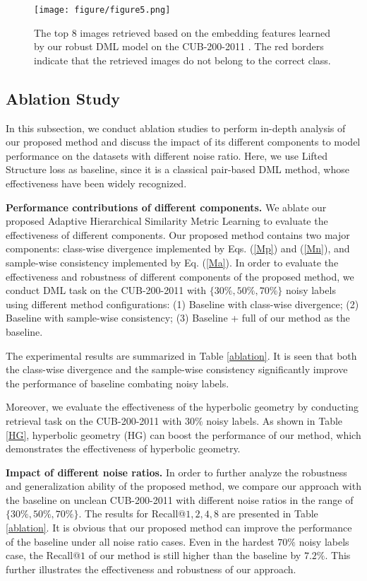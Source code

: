\documentclass[lettersize,journal]{IEEEtran}
\begin{document}
\begin{figure*}[t]
	\centering
	\texttt{[image: figure/figure5.png]}
	\caption{The top 8 images retrieved based on the  embedding features learned by our robust DML model on the  CUB-200-2011 \cite{wah2011caltech}. The red borders indicate that the retrieved images do not belong to the correct class.}
	\label{visualization}
\end{figure*}

\subsection{Ablation Study}
In this subsection, we conduct ablation studies to perform in-depth analysis of our proposed method and  discuss the impact of its different components to model performance on the datasets with different noise ratio. Here, we use Lifted Structure loss \cite{oh2016deep} as baseline, since it is a classical pair-based DML method, whose effectiveness have been widely recognized.

\textbf{Performance contributions of different components.} We ablate our proposed Adaptive Hierarchical Similarity Metric Learning to evaluate the effectiveness of different components. Our proposed
method contains two major components: class-wise divergence implemented by Eqs. (\ref{Mp}) and (\ref{Mn}), and sample-wise consistency implemented by Eq. (\ref{Ma}). In
order to evaluate the effectiveness and robustness of different components of the proposed method, we conduct  DML task on the CUB-200-2011 \cite{wah2011caltech} with $\lbrace 30\%, 50\%, 70\% \rbrace$ noisy labels using different method configurations: (1) Baseline with class-wise divergence; (2) Baseline with sample-wise consistency; (3) Baseline + full of our method as the baseline. 

The experimental results are summarized in Table \ref{ablation}. It is seen that both the class-wise divergence and the sample-wise consistency significantly improve the performance of baseline combating noisy labels.

Moreover, we evaluate the effectiveness of the hyperbolic geometry by conducting retrieval task on the  CUB-200-2011 \cite{wah2011caltech} with $ 30\%$ noisy labels. As shown in Table \ref{HG}, hyperbolic geometry (HG) can  boost the performance of our method, which demonstrates the effectiveness of hyperbolic geometry. 

\textbf{Impact of different noise ratios.} In order to further analyze the robustness and generalization ability of the proposed method, we compare our approach with the baseline on unclean CUB-200-2011 \cite{wah2011caltech} with different noise ratios in the range of $\lbrace 30\%, 50\%, 70\% \rbrace$. The results for Recall@$1, 2, 4, 8$ are presented in Table \ref{ablation}. It is obvious that our proposed method can improve the performance of the baseline under all noise ratio cases. Even in the hardest $70\%$ noisy labels case,  the Recall@$1$ of our method is still higher than the baseline by $7.2\%$. This further illustrates the effectiveness and robustness of our approach.
\end{document}
